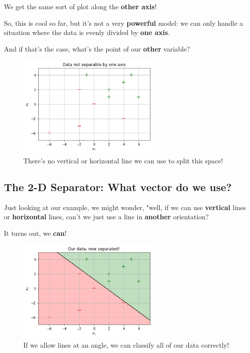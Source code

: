         We get the same sort of plot along the \textbf{other axis}!
        
        So, this is cool so far, but it's not a very \textbf{powerful} model: we can only handle a situation where the data is evenly divided by \textbf{one axis}.
        
        And if that's the case, what's the point of our \textbf{other} variable?
        
        \begin{figure}[H]
            \centering
                \includegraphics[width=70mm,scale=0.5]{images/classification_images/data_not_1d_separable.png}
                
                \caption*{There's no vertical or horizontal line we can use to split this space!}
        \end{figure}
        
    \subsection*{The 2-D Separator: What vector do we use?}
    
        Just looking at our example, we might wonder, "well, if we can use \textbf{vertical} lines or \textbf{horizontal} lines, can't we just use a line in \textbf{another} orientation?
        
        It turns out, we \textbf{can}!
        
        \begin{figure}[H]
            \centering
                \includegraphics[width=70mm,scale=0.5]{images/classification_images/data_2d_separable.png}
                
                \caption*{If we allow lines at an angle, we can classify all of our data correctly!}
        \end{figure}
        
